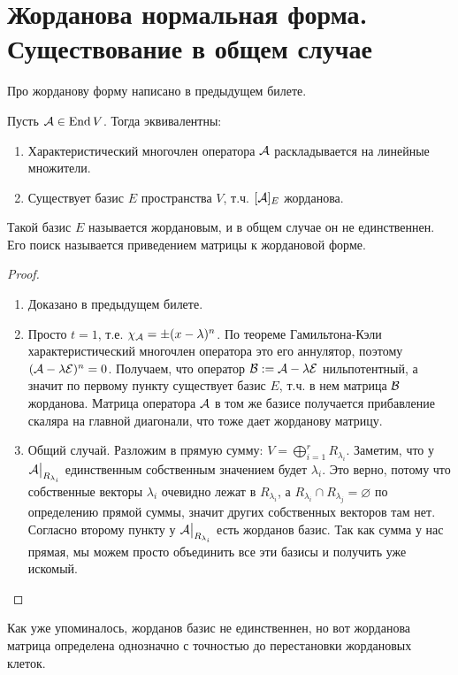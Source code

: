 \section{Жорданова нормальная форма. Существование в общем случае}
Про жорданову форму написано в предыдущем билете.

\begin{theorem-non}
    Пусть $\mathcal{A} \in \operatorname{End} V$. Тогда эквивалентны: \begin{enumerate}
        \item Характеристический многочлен оператора $\mathcal{A}$ раскладывается на линейные множители.
        \item Существует базис $E$ пространства $V$, т.ч. $[\mathcal{A}]_E$ жорданова. 
    \end{enumerate}
    Такой базис $E$ называется жордановым, и в общем случае он не единственнен. 
    Его поиск называется приведением матрицы к жордановой форме.
\end{theorem-non}
\begin{proof} \quad 

    \begin{enumerate}
        \item Доказано в предыдущем билете.
        \item Просто $t = 1$, т.е. $\chi_{\mathcal{A}} = \pm (x - \lambda)^n$. 
        По теореме Гамильтона-Кэли характеристический многочлен оператора это его аннулятор, поэтому $(\mathcal{A} - \lambda \mathcal{E})^n = 0$. 
        Получаем, что оператор $\mathcal{B} := \mathcal{A} - \lambda \mathcal{E}$ нильпотентный, а значит по первому пункту существует базис $E$, т.ч. в нем матрица $\mathcal{B}$ жорданова. 
        Матрица оператора $\mathcal{A}$ в том же базисе получается прибавление скаляра на главной диагонали, что тоже дает жорданову матрицу.
        
        \item Общий случай. Разложим в прямую сумму: $V = \bigoplus\limits_{i = 1}^{r} R_{\lambda_i}$.
        Заметим, что у $\mathcal{A} \big|_{R_{\lambda_i}}$ единственным собственным значением будет $\lambda_i$.
        Это верно, потому что собственные векторы $\lambda_i$ очевидно лежат в $R_{\lambda_i}$, а $R_{\lambda_i} \cap R_{\lambda_j} = \varnothing$ по определению прямой суммы, значит других собственных векторов там нет.
        Согласно второму пункту у $\mathcal{A} \big|_{R_{\lambda_i}}$ есть жорданов базис.
        Так как сумма у нас прямая, мы можем просто объединить все эти базисы и получить уже искомый.
    \end{enumerate}
\end{proof}

\notice Как уже упоминалось, жорданов базис не единственнен, но вот жорданова матрица определена однозначно с точностью до перестановки жордановых клеток. 
